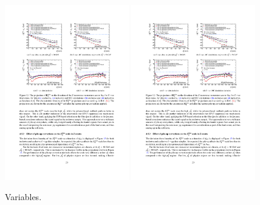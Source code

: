 \begin{figure}[tp]
  \centering
  \includegraphics[width=0.48\textwidth]{figures/performance/met-bias-inclusive}
  \includegraphics[width=0.48\textwidth]{figures/performance/met-bias-0jet}
  \caption{Variables.}
  \label{fig:strategy-objects-met-bias}
\end{figure}

